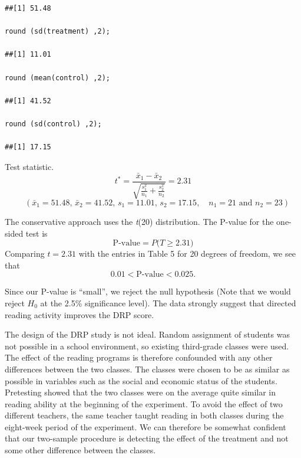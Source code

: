 \begin{example}
\begin{tcolorbox}[colback=gray!10, colframe=black!45, arc=2mm, before skip=4pt, after skip=4pt]
\begin{verbatim}
##[1] 51.48

round (sd(treatment) ,2);

##[1] 11.01

round (mean(control) ,2);

##[1] 41.52

round (sd(control) ,2);

##[1] 17.15
\end{verbatim}
\end{tcolorbox}
Test statistic. \\
\[
t^* = \frac{\bar{x}_1 - \bar{x}_2}{\sqrt{\frac{s_1^2}{n_1} + \frac{s_2^2}{n_2}}} = 2.31
\]
\[
\quad
(\bar{x}_1 = 51.48, \, \bar{x}_2 = 41.52, \, s_1 = 11.01, \, s_2 = 17.15,
\quad n_1 = 21 \text{ and } n_2 = 23)
\]

\vspace{1em}

The conservative approach uses the \textit{t}(20) distribution. The P-value for the one-sided test is
\[
\text{P-value} = P\bigl(T \geq 2.31 \bigr)
\]
Comparing $t = 2.31$ with the entries in Table 5 for 20 degrees of freedom, we see that
\[
0.01 < \text{P-value} < 0.025.
\]

\vspace{1em}

Since our P-value is ``small'', we reject the null hypothesis (Note that we would reject $H_0$ at the 2.5\% significance level). The data strongly suggest that directed reading activity improves the DRP score.

\vspace{1em}

The design of the DRP study is not ideal. Random assignment of students was not possible in a school environment, so existing third-grade classes were used. The effect of the reading programs is therefore confounded with any other differences between the two classes. The classes were chosen to be as similar as possible in variables such as the social and economic status of the students. Pretesting showed that the two classes were on the average quite similar in reading ability at the beginning of the experiment. To avoid the effect of two different teachers, the same teacher taught reading in both classes during the eight-week period of the experiment. We can therefore be somewhat confident that our two-sample procedure is detecting the effect of the treatment and not some other difference between the classes.

\end{example}
